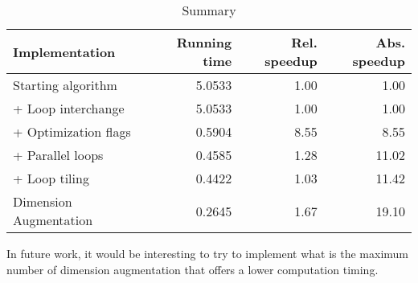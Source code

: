 \documentclass[conference]{IEEEtran}
\begin{document}
\renewcommand{\tablename}{Table}

\begin{table}[h!]
\begin{tabular}{||l r r r||} 
\hline
 Implementation & Running time & Rel. speedup & Abs. speedup \\ [0.5ex] 
 \hline\hline
 Starting algorithm & 5.0533 & 1.00 & 1.00 \\
 + Loop interchange & 5.0533 & 1.00 & 1.00 \\
 + Optimization flags & 0.5904 & 8.55 & 8.55 \\
 + Parallel loops & 0.4585 & 1.28 & 11.02 \\
 + Loop tiling & 0.4422 & 1.03 & 11.42 \\
 Dimension Augmentation & 0.2645 & 1.67 & 19.10 \\ [1ex] 
\hline
\end{tabular}
\caption{Summary}
\label{table:optimization-summary}
\end{table}

In future work, it would be interesting to try to implement what is the maximum number of dimension augmentation that offers a lower computation timing.
\end{document}
